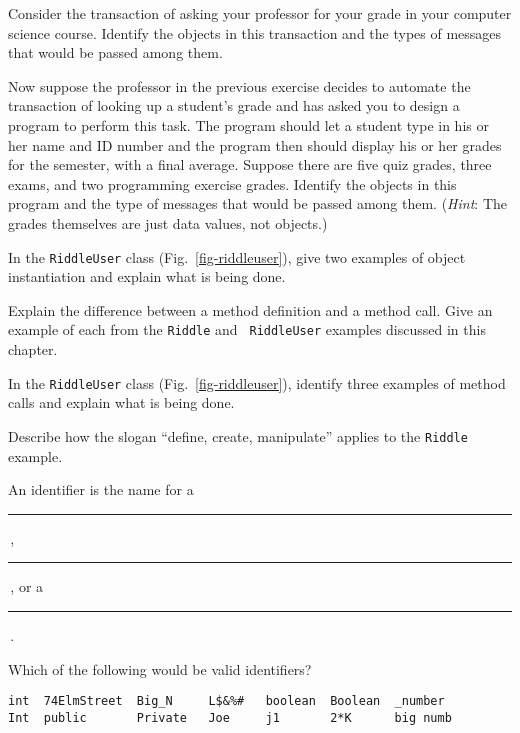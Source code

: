 \label{exercises}
\begin{EXRtwo}
\item  Consider the transaction of asking your professor for
your grade in your computer science course.  Identify the objects in
this transaction and the types of messages that would be passed among them.

\item  Now suppose the professor in the previous exercise decides
to automate the transaction of looking up a student's grade and has
asked you to design a program to perform this task. The program should
let a student type in his or her name and ID number and the program
then should display his or her grades for the semester, with a final
average. Suppose there are five quiz grades, three exams, and two
programming exercise grades.  Identify the objects in this program and the type of
messages that would be passed among them. ({\it Hint}: The grades
themselves are just data values, not objects.)

\item  In the {\tt RiddleUser} class (Fig.~\ref{fig-riddleuser}),
give two examples of object instantiation and explain what is being
done.

\item  Explain the difference between a method definition and
a method call. Give an example of each from the {\tt Riddle} and {\tt
RiddleUser} examples discussed in this chapter.

\item  In the {\tt RiddleUser} class (Fig.~\ref{fig-riddleuser}),
identify three examples of method calls and explain what is being
done.

\item  Describe how the slogan ``define, create, manipulate'' applies
to the {\tt Riddle}  example.

\item  An identifier is the name for a \rule{30pt}{0.5pt}\,, 
\rule{30pt}{0.5pt}\,,
or a \rule{30pt}{0.5pt}\,.

\item  Which of the following would be valid identifiers?

\begin{jjjlisting}
\begin{lstlisting}
int  74ElmStreet  Big_N     L$&%#   boolean  Boolean  _number
Int  public       Private   Joe     j1       2*K      big numb
\end{lstlisting}
\end{jjjlisting}


\end{EXRtwo}
